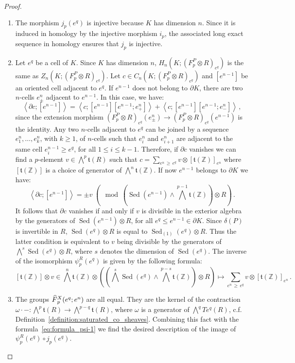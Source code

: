 \documentclass[AHL,Unicode,longabstracts,published]{cedram}
\newcommand{\Z}{\mathbb{Z}}
\renewcommand{\t}{\mathfrak{t}}
\DeclareMathOperator{\Sed}{Sed}
\newcommand{\Fbar}{\hat{F}}
\newcommand{\ori}{[\t(\Z)]}
\let\oldhat\hat
\renewcommand*{\hat}[1]{\mathchoice{\widehat{#1}}{\widehat{#1}}{\oldhat{#1}}{\oldhat{#1}}}
\begin{document}
\begin{proof}
\begin{enumerate}
\item The morphism $j_p(e^q)$ is injective because $K$ has dimension $n$. Since it is induced in homology by the injective morphism $i_p$, the associated long exact sequence in homology ensures that $j_p$ is injective.
\item Let $e^q$ be a cell of $K$. Since $K$ has dimension $n$, ${H_n(K;(F_p^P\otimes R)_{e^q})}$ is the same as $Z_n(K;(F_p^P\otimes R)_{e^q})$. Let $c\in C_n(K;(F_p^P\otimes R)_{e^q})$ and $[e^{n-1}]$ be an oriented cell adjacent to $e^q$. If $e^{n-1}$ does not belong to $\partial K$, there are two $n$-cells $e^n_\pm$ adjacent to $e^{n-1}$. In this case, we have:
\begin{equation*}
\left\langle \partial c;[e^{n-1}]\right\rangle = \left\langle c;[e^{n-1}][e^{n-1};e^n_+]\right\rangle + \left\langle c;[e^{n-1}][e^{n-1};e^n_-]\right\rangle\,,
\end{equation*}
\noindent since the extension morphism ${(F_p^P\otimes R)_{e^q}(e^n_\pm)\rightarrow (F_p^P\otimes R)_{e^q}(e^{n-1})}$ is the identity. Any two $n$-cells adjacent to $e^q$ can be joined by a sequence $e^n_1,\dots,e^n_k$, with $k\geq 1$, of $n$-cells such that $e^n_i$ and $e^n_{i+1}$ are adjacent to the same cell $e^{n-1}_i\geq e^q$, for all $1\leq i\leq k-1$. Therefore, if $\partial c$ vanishes we can find a $p$-element $v\in\bigwedge^p\t(R)$ such that $c=\sum_{e^n\,\geq\,e^q} v\otimes \ori_{e^n}$ where $\ori$ is a choice of generator of $\bigwedge^n\t(\Z)$. If now $e^{n-1}$ belongs to $\partial K$ we have:
\begin{equation*}
\left\langle \partial c;[e^{n-1}]\right\rangle = \pm v \;\left(\mod \left(\Sed(e^{n-1})\wedge\bigwedge^{p-1}\t(\Z)\right)\otimes R\right)\,.
\end{equation*}
It follows that $\partial c$ vanishes if and only if $v$ is divisible in the exterior algebra by the generators of ${\Sed(e^{n-1})\otimes R}$, for all $e^q\leq e^{n-1}\in\partial K$. Since $\delta(P)$ is invertible in $R$, $\Sed(e^q)\otimes R$ is equal to $\Sed_{(1)}(e^q)\otimes R$. Thus the latter condition is equivalent to $v$ being divisible by the generators of $\bigwedge^s\Sed(e^q)\otimes R$, where $s$ denotes the dimension of $\Sed(e^q)$. The inverse of the isomorphism $\psi^R_p(e^q)$ is given by the following formula:
\begin{equation}\label{eq:formula_psi-1}
\tag{$\Psi$}
\ori\otimes v\in \bigwedge^n\t(\Z)\otimes\left(\left(\bigwedge^s\Sed(e^q)\wedge\bigwedge^{p-s}\t(\Z)\right)\otimes R\right) \longmapsto \sum_{e^n\,\geq\,e^q} v\otimes\ori_{e^n}\,.
\end{equation}
\item The groups $\Fbar^X_p(e^q;e^n)$ are all equal. They are the kernel of the contraction $\omega\cdot-:\bigwedge^p\t(R) \rightarrow \bigwedge^{p-q}\t(R)$, where $\omega$ is a generator of $\bigwedge^qTe^q(R)$, c.f. Definition~\ref{definition:saturated_co_sheaves}. Combining this fact with the formula~\eqref{eq:formula_psi-1} we find the desired description of the image of $\psi^R_p(e^q)\circ j_p(e^q)$.\qedhere
\end{enumerate}
\end{proof}
\end{document}

